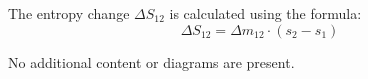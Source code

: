 The entropy change \( \Delta S_{12} \) is calculated using the formula:  
\[
\Delta S_{12} = \Delta m_{12} \cdot (s_2 - s_1)
\]  

No additional content or diagrams are present.